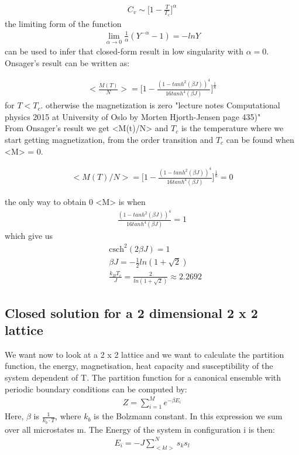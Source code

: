 \documentclass[10pt,a4paper]{article}
\begin{document}
\begin{align}
C_v \sim \Bigg[ 1- \frac{T}{T_c}\Bigg]^{\alpha}
\end{align}
the limiting form of the function
\begin{align}
\lim_{\alpha \to 0} \frac{1}{\alpha}(Y^{-\alpha}-1)=-lnY
\end{align}
can be used to infer that closed-form result in low singularity with $\alpha = 0.$
Onsager's result can be written as:

\begin{align}
<\frac{M(T)}{N}> = \Bigg[ 1- \frac{(1 - tanh ^2(\beta J))^{4}}{16tanh^{4}(\beta J)} \Bigg] ^{\frac{1}{8}} 
\end{align}
for $T<T_c.$ otherwise the magnetization is zero 
"lecture notes Computational physics 2015 at University of Oslo by Morten Hjorth-Jensen page 435)"\\
 
 
From Onsager's result we get <M(t)/N> and $T_c$ is the temperature where we start getting magnetization, from the order transition and $T_c$ can be found when <M> = 0.
   
\begin{align}
<M(T)/N> = \Bigg[ 1- \frac{(1 - tanh ^2(\beta J))^{4}}{16tanh^{4}(\beta J)} \Bigg] ^{\frac{1}{8}} = 0
\end{align}

the only way to obtain 0 <M> is when 
\begin{align}
\frac{(1 - tanh ^2(\beta J))^{4}}{16tanh^{4}(\beta J)} = 1
\end{align}
which give us 
\begin{align}
&\mathrm{csch^2}(2 \beta J) = 1 \\
&\beta J = - \frac{1}{2} ln(1+\sqrt{2})\\
&\frac {k_B T_c}{J} = \frac{2}{ln(1+\sqrt{2})}\approx 2.2692
\end{align}

\subsection{Closed solution for a 2 dimensional 2 x 2 lattice}

We want now to look at a 2 x 2 lattice and we want to calculate the partition function, the energy, magnetisation, heat capacity and susceptibility of the system  dependent of T. 
The partition function for a canonical ensemble with periodic boundary conditions can be computed  by:
\begin{align}
Z= \sum_{i=1}^{M} e^{- \beta E_i}
\end{align} 
Here, $\beta$ is $\frac{1}{k_b \cdot T}$, where $k_b$ is the Bolzmann constant. 
In this expression we sum over all microstates m. The Energy of the system in configuration i is then:
\begin{align}
E_i = - J \sum_{<kl>}^N s_k s_l 
\end{align} 
\end{document}
